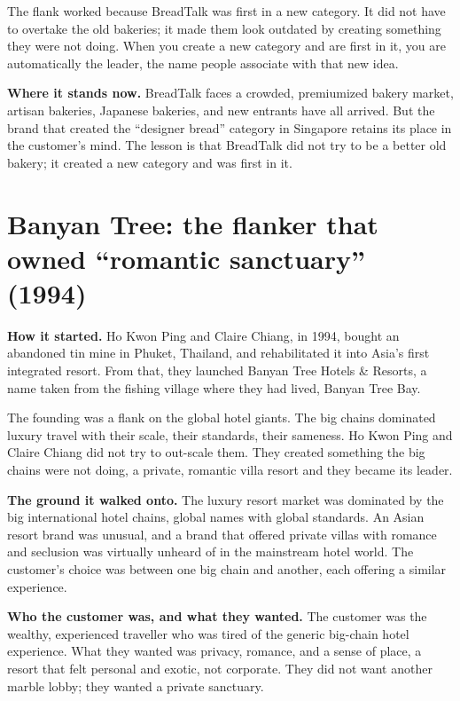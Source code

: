 \documentclass[10pt,twoside,openany]{memoir}
\newcommand{\needspacehead}{\needspace{4\baselineskip}}
\let\oldsection\section
\renewcommand{\section}{\needspacehead\oldsection}
\begin{document}
The flank worked because BreadTalk was first in a new category. It did
not have to overtake the old bakeries; it made them look outdated by
creating something they were not doing. When you create a new category
and are first in it, you are automatically the leader, the name people
associate with that new idea.

\textbf{Where it stands now.} BreadTalk faces a crowded, premiumized
bakery market, artisan bakeries, Japanese bakeries, and new entrants
have all arrived. But the brand that created the ``designer bread''
category in Singapore retains its place in the customer's mind. The
lesson is that BreadTalk did not try to be a better old bakery; it
created a new category and was first in it.

\section{Banyan Tree: the flanker that owned ``romantic sanctuary''
(1994)}\label{banyan-tree-the-flanker-that-owned-romantic-sanctuary-1994}

\textbf{How it started.} Ho Kwon Ping and Claire Chiang, in 1994, bought
an abandoned tin mine in Phuket, Thailand, and rehabilitated it into
Asia's first integrated resort. From that, they launched Banyan Tree
Hotels \& Resorts, a name taken from the fishing village where they had
lived, Banyan Tree Bay.

The founding was a flank on the global hotel giants. The big chains
dominated luxury travel with their scale, their standards, their
sameness. Ho Kwon Ping and Claire Chiang did not try to out-scale them.
They created something the big chains were not doing, a private,
romantic villa resort and they became its leader.

\textbf{The ground it walked onto.} The luxury resort market was
dominated by the big international hotel chains, global names with
global standards. An Asian resort brand was unusual, and a brand that
offered private villas with romance and seclusion was virtually unheard
of in the mainstream hotel world. The customer's choice was between one
big chain and another, each offering a similar experience.

\textbf{Who the customer was, and what they wanted.} The customer was
the wealthy, experienced traveller who was tired of the generic
big-chain hotel experience. What they wanted was privacy, romance, and a
sense of place, a resort that felt personal and exotic, not corporate.
They did not want another marble lobby; they wanted a private sanctuary.
\end{document}
